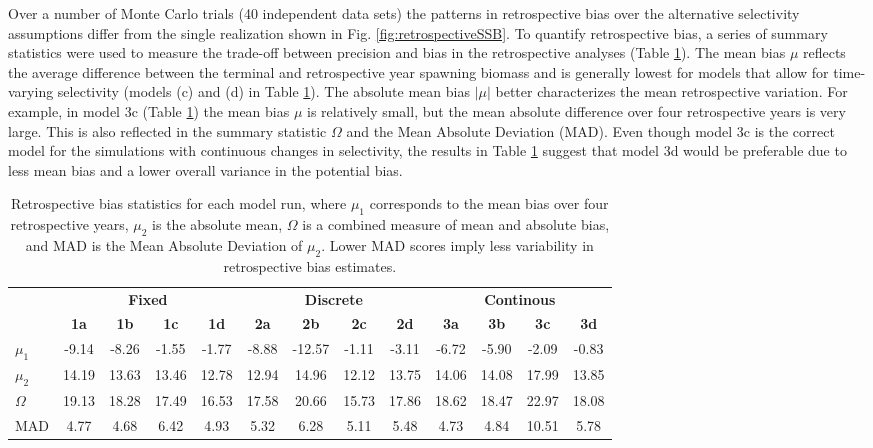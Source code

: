 Over a number of Monte Carlo trials (40 independent data sets) the patterns in retrospective bias over the alternative selectivity assumptions differ from the single realization shown in Fig. \ref{fig:retrospectiveSSB}.  To quantify retrospective bias, a series of summary statistics were used to measure the trade-off between precision and bias in the retrospective analyses (Table \ref{tab:RetroStatistics}).  The mean bias $\mu$ reflects the average difference between the terminal and retrospective year spawning biomass and is generally lowest for models that allow for time-varying selectivity (models (c) and (d) in Table \ref{tab:RetroStatistics}).  The absolute mean bias $|\mu|$ better characterizes the mean retrospective  variation.  For example, in model 3c (Table \ref{tab:RetroStatistics}) the mean bias $\mu$ is relatively small, but the mean absolute difference over four retrospective years is very large.  This is also reflected in the summary statistic $\Omega$ and the Mean Absolute Deviation (MAD).  Even though model 3c is the correct model for the simulations with continuous changes in selectivity, the results in Table \ref{tab:RetroStatistics} suggest that model 3d would be preferable due to less mean bias and a lower overall variance in the potential bias.  

\begin{table}[!tbh]
	\caption{Retrospective bias statistics for each model run, where $\mu_1$ corresponds to the mean bias over four retrospective years, $\mu_2$ is the absolute mean, $\Omega$ is a combined measure of mean and absolute bias, and MAD is the Mean Absolute Deviation of $\mu_2$.  Lower MAD scores imply less variability in retrospective bias estimates.}
	\label{tab:RetroStatistics}
	\begin{center}
	\begin{footnotesize}
		
		\begin{tabular}{l|cccc|cccc|cccc}
		\hline

		\hline
		&\multicolumn{4}{c|}{\textbf{Fixed}} & \multicolumn{4}{c|}{\textbf{Discrete}} & \multicolumn{4}{c}{\textbf{Continous}} \\
		&\textbf{1a}  &\textbf{1b}  &\textbf{1c}  &\textbf{1d}  &\textbf{2a}   &\textbf{2b}  &\textbf{2c}  &\textbf{2d}  &\textbf{3a}  &\textbf{3b}  &\textbf{3c}  &\textbf{3d}\\
		\hline
		$\mu_1$     &-9.14& -8.26& -1.55& -1.77& -8.88& -12.57& -1.11& -3.11& -6.72& -5.90& -2.09& -0.83\\
		$\mu_2$ &14.19& 13.63& 13.46& 12.78& 12.94&  14.96& 12.12& 13.75& 14.06& 14.08& 17.99& 13.85\\
		$\Omega$  &19.13& 18.28& 17.49& 16.53& 17.58&  20.66& 15.73& 17.86& 18.62& 18.47& 22.97& 18.08\\
		MAD    & 4.77&  4.68&  6.42&  4.93&  5.32&   6.28&  5.11&  5.48&  4.73&  4.84& 10.51&  5.78\\

		\hline

		\hline
		\end{tabular}
	\end{footnotesize}
	\end{center}
\end{table}

